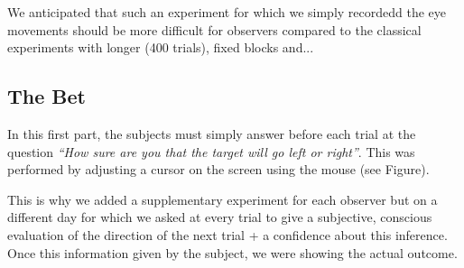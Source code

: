 \documentclass[profile,final,english, draft]{article}%
\begin{document}
We anticipated that such an  experiment for which we simply recordedd the eye movements should be more difficult for observers compared to the classical experiments with longer (400 trials), fixed blocks and...

\subsection{The Bet}
In this first part, the subjects must simply answer before each trial at the question \textit{ ``How sure are you that the target will go left or right''}. This was performed by adjusting a cursor on the screen using the mouse (see Figure).





This is why we added a supplementary experiment for each observer but on a different day for which we asked at every trial to give a subjective, conscious evaluation of the direction of the next trial + a confidence about this inference. Once this information given by the subject, we were showing the actual outcome.
\end{document}
